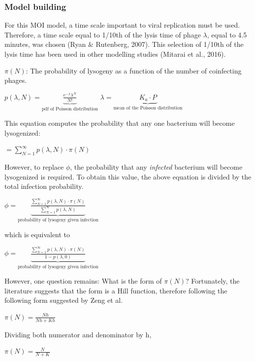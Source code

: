 \documentclass{article}
\begin{document}
\subsubsection{Model building}
For this MOI model, a time scale important to viral replication must be used. Therefore, a time scale equal to 1/10th of the lysis time of phage $\lambda$, equal to 4.5 minutes, was chosen (Ryan $\&$ Rutenberg, 2007). This selection of 1/10th of the lysis time has been used in other modelling studies (Mitarai et al., 2016). 

$\pi(N)$: The probability of lysogeny as a function of the number of coinfecting phages. 

\begin{center}$
p(\lambda, N) = \underbrace{\frac{{e^{ - \lambda } \lambda ^N}}{{N!}}}_{\text{pdf of Poisson distribution}}$
$\lambda = \underbrace{K_a \cdot P}_{\text{mean of the Poisson distribution}}$
\end{center} 

This equation computes the probability that any one bacterium will become lysogenized:
\begin{center}
$=\sum_{N=1}^{\infty}{p(\lambda, N) \cdot \pi(N)}$
\end{center}

However, to replace $\phi$, the probability that any \emph{infected} bacterium will become lysogenized is required. To obtain this value, the above equation is divided by the total infection probability. 
\begin{center}
$
\phi = \underbrace{\frac{\sum_{N=1}^{\infty}{p(\lambda, N) \cdot \pi(N)}}{\sum_{N=1}^{\infty}p(\lambda, N) }}_{\text{probability of lysogeny given infection}}$
\end{center}

which is equivalent to 
\begin{center}
$\phi = \underbrace{\frac{\sum_{N=1}^{\infty}{p(\lambda, N) \cdot \pi(N)}}{1-p(\lambda, 0)}}_{\text{probability of lysogeny given infection}}$
\end{center}

However, one question remains: What is the form of $\pi(N)$? Fortunately, the literature suggests that the form is a Hill function, therefore following the following form suggested by Zeng et al. 

\begin{center}
$\pi(N) = \frac{Nh}{Nh + Kh}$
\end{center}
Dividing both numerator and denominator by h,
\begin{center}
$\pi(N) = \frac{N}{N + K}$
\end{center}
\end{document}
